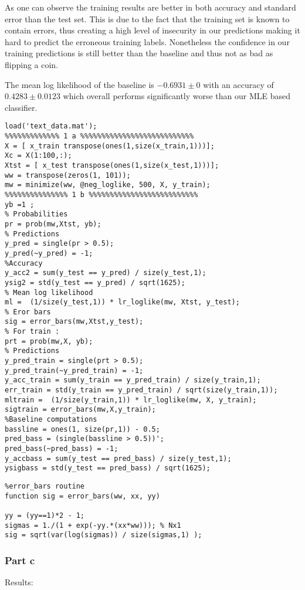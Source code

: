 \documentclass[11pt]{article}
\begin{document}
As one can observe the training results are better in both accuracy and standard error than the test set. This is due to the fact that the training set is known to contain errors, thus creating a high level of insecurity in our predictions making it hard to predict the erroneous training labels. Nonetheless the confidence in our training predictions is still better than the baseline and thus not as bad as flipping a coin.

The mean log likelihood of the baseline is $-0.6931 \pm 0$  with an accuracy of $0.4283 \pm 0.0123$  which overall performs significantly worse than our MLE based classifier.

\begin{lstlisting}
load('text_data.mat');
%%%%%%%%%%%%% 1 a %%%%%%%%%%%%%%%%%%%%%%%%%%%
X = [ x_train transpose(ones(1,size(x_train,1)))];
Xc = X(1:100,:);
Xtst = [ x_test transpose(ones(1,size(x_test,1)))];
ww = transpose(zeros(1, 101));
mw = minimize(ww, @neg_loglike, 500, X, y_train);
%%%%%%%%%%%%%%% 1 b %%%%%%%%%%%%%%%%%%%%%%%%%%
yb =1 ;
% Probabilities
pr = prob(mw,Xtst, yb);
% Predictions
y_pred = single(pr > 0.5);
y_pred(~y_pred) = -1;
%Accuracy
y_acc2 = sum(y_test == y_pred) / size(y_test,1);
ysig2 = std(y_test == y_pred) / sqrt(1625);
% Mean log likelihood
ml =  (1/size(y_test,1)) * lr_loglike(mw, Xtst, y_test);
% Eror bars
sig = error_bars(mw,Xtst,y_test);
% For train :
prt = prob(mw,X, yb);
% Predictions
y_pred_train = single(prt > 0.5);
y_pred_train(~y_pred_train) = -1;
y_acc_train = sum(y_train == y_pred_train) / size(y_train,1);
err_train = std(y_train == y_pred_train) / sqrt(size(y_train,1));
mltrain =  (1/size(y_train,1)) * lr_loglike(mw, X, y_train);
sigtrain = error_bars(mw,X,y_train);
%Baseline computations
bassline = ones(1, size(pr,1)) - 0.5;
pred_bass = (single(bassline > 0.5))';
pred_bass(~pred_bass) = -1;
y_accbass = sum(y_test == pred_bass) / size(y_test,1);
ysigbass = std(y_test == pred_bass) / sqrt(1625);
\end{lstlisting}

\begin{lstlisting}
%error_bars routine
function sig = error_bars(ww, xx, yy)

yy = (yy==1)*2 - 1;
sigmas = 1./(1 + exp(-yy.*(xx*ww))); % Nx1
sig = sqrt(var(log(sigmas)) / size(sigmas,1) );
\end{lstlisting}



\subsubsection{Part c}
Results:
\end{document}
